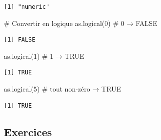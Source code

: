 \documentclass[
  french,
  11pt,
  a4paper,
]{article}
\newenvironment{Shaded}{}{}
\newcommand{\CommentTok}[1]{\textcolor[rgb]{0.42,0.45,0.49}{#1}}
\newcommand{\DecValTok}[1]{\textcolor[rgb]{0.00,0.36,0.77}{#1}}
\newcommand{\FunctionTok}[1]{\textcolor[rgb]{0.44,0.26,0.76}{#1}}
\newcommand{\NormalTok}[1]{\textcolor[rgb]{0.14,0.16,0.18}{#1}}
\begin{document}
\begin{verbatim}
[1] "numeric"
\end{verbatim}

\begin{Shaded}
\begin{Highlighting}[]
\CommentTok{\# Convertir en logique}
\FunctionTok{as.logical}\NormalTok{(}\DecValTok{0}\NormalTok{)   }\CommentTok{\# 0 → FALSE}
\end{Highlighting}
\end{Shaded}

\begin{verbatim}
[1] FALSE
\end{verbatim}

\begin{Shaded}
\begin{Highlighting}[]
\FunctionTok{as.logical}\NormalTok{(}\DecValTok{1}\NormalTok{)   }\CommentTok{\# 1 → TRUE}
\end{Highlighting}
\end{Shaded}

\begin{verbatim}
[1] TRUE
\end{verbatim}

\begin{Shaded}
\begin{Highlighting}[]
\FunctionTok{as.logical}\NormalTok{(}\DecValTok{5}\NormalTok{)   }\CommentTok{\# tout non{-}zéro → TRUE}
\end{Highlighting}
\end{Shaded}

\begin{verbatim}
[1] TRUE
\end{verbatim}

\subsection{Exercices}\label{exercices}
\end{document}
